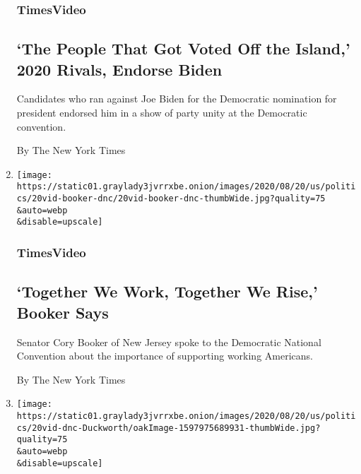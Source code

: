 \begin{enumerate}
  \hypertarget{timesvideo-4}{%
  \subsubsection{TimesVideo}\label{timesvideo-4}}

  \hypertarget{the-people-that-got-voted-off-the-island-2020-rivals-endorse-biden}{%
  \subsection{`The People That Got Voted Off the Island,' 2020 Rivals,
  Endorse
  Biden}\label{the-people-that-got-voted-off-the-island-2020-rivals-endorse-biden}}

  Candidates who ran against Joe Biden for the Democratic nomination for
  president endorsed him in a show of party unity at the Democratic
  convention.

  By The New York Times
\item
  \href{/video/us/elections/100000007299801/cory-booker-speaks-dnc.html}{}

  \texttt{[image: https://static01.graylady3jvrrxbe.onion/images/2020/08/20/us/politics/20vid-booker-dnc/20vid-booker-dnc-thumbWide.jpg?quality=75\\\&auto=webp\\\&disable=upscale]}

  \hypertarget{timesvideo-5}{%
  \subsubsection{TimesVideo}\label{timesvideo-5}}

  \hypertarget{together-we-work-together-we-rise-booker-says}{%
  \subsection{`Together We Work, Together We Rise,' Booker
  Says}\label{together-we-work-together-we-rise-booker-says}}

  Senator Cory Booker of New Jersey spoke to the Democratic National
  Convention about the importance of supporting working Americans.

  By The New York Times
\item
  \href{/video/us/elections/100000007299848/tammy-duckworth-speaks-dnc.html}{}

  \texttt{[image: https://static01.graylady3jvrrxbe.onion/images/2020/08/20/us/politics/20vid-dnc-Duckworth/oakImage-1597975689931-thumbWide.jpg?quality=75\\\&auto=webp\\\&disable=upscale]}

  \hypertarget{timesvideo-6}{%
}
\end{enumerate}
